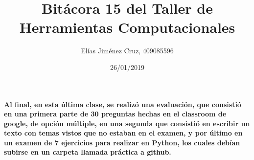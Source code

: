 \documentclass[letterpaper, 12pt, oneside]{article} %
\title{\Huge Bitácora 15 del Taller de Herramientas Computacionales}
\author{Elías Jiménez Cruz, 409085596}
\date{26/01/2019}
\begin{document}
	\maketitle
	\paragraph{Al final, en esta última clase, se realizó una evaluación, que consistió en una primera parte de 30 preguntas hechas en el classroom de google, de opción múltiple, en una segunda que consistió en escribir un texto con temas vistos que no estaban en el examen, y por último en un examen de 7 ejercicios para realizar en Python, los cuales debían subirse en un carpeta llamada práctica a github.}
\end{document}
